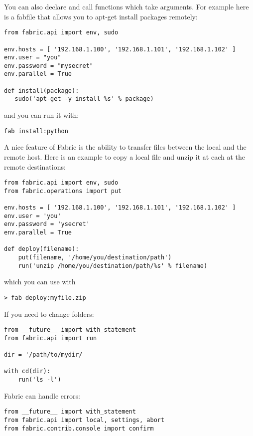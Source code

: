 \documentclass[justified,sixbynine]{tufte-book}
\theoremstyle{plain}%
\theoremstyle{definition}
\theoremstyle{remark}
\begin{document}
\begin{fullwidth}
You can also declare and call functions which take arguments. For example here is a fabfile that allows you to apt-get install packages remotely:

\begin{lstlisting}
from fabric.api import env, sudo

env.hosts = [ '192.168.1.100', '192.168.1.101', '192.168.1.102' ]
env.user = "you"
env.password = "mysecret"
env.parallel = True

def install(package):
   sudo('apt-get -y install %s' % package)
\end{lstlisting}

and you can run it with:

\begin{lstlisting}
fab install:python
\end{lstlisting}

A nice feature of Fabric is the ability to transfer files between the local and the remote host. Here is an example to copy a local file and unzip it at each at the remote destinations:

\begin{lstlisting}
from fabric.api import env, sudo
from fabric.operations import put

env.hosts = [ '192.168.1.100', '192.168.1.101', '192.168.1.102' ]
env.user = 'you'
env.password = 'ysecret'
env.parallel = True

def deploy(filename):
    put(filename, '/home/you/destination/path')
    run('unzip /home/you/destination/path/%s' % filename)
\end{lstlisting}

which you can use with

\begin{lstlisting}
> fab deploy:myfile.zip
\end{lstlisting}

If you need to change folders:

\begin{lstlisting}
from __future__ import with_statement
from fabric.api import run

dir = '/path/to/mydir/

with cd(dir):
    run('ls -l')
\end{lstlisting}

Fabric can handle errors:
\begin{lstlisting}
from __future__ import with_statement
from fabric.api import local, settings, abort
from fabric.contrib.console import confirm


\end{lstlisting}
\end{fullwidth}
\end{document}
